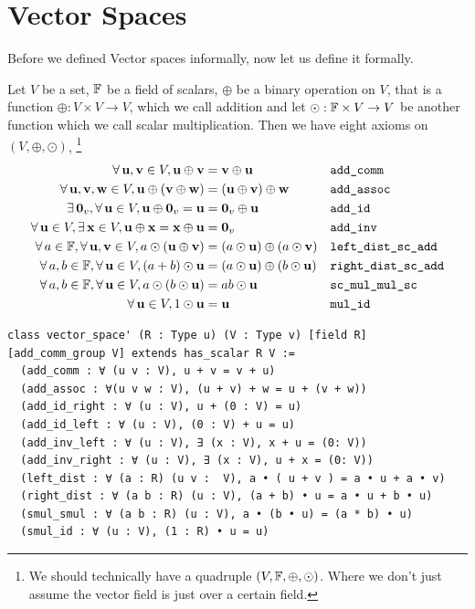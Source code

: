 \documentclass{article}
\begin{document}
\section{Vector Spaces}
Before we defined Vector spaces informally, now let us define it formally.
\begin{ndefi}
  Let $V$ be a set, $\mathbb{F}$ be a field of scalars, $\oplus$ be a binary operation on $V$, that is a function $\oplus : V\times V \to V$, which we call addition and let $\odot : \mathbb{F} \times V \to V$ be another function which we call scalar multiplication. Then we have eight axioms on $(V, \oplus, \odot)$, \footnote{We should technically have a quadruple $(V, \mathbb{F}, \oplus, \odot)$. Where we don't just assume the vector field is just over a certain field.}
  \begin{align*}
    \forall\, \boldsymbol{\mathbf{u}},\boldsymbol{\mathbf{v}} \in V, \boldsymbol{\mathbf{u}} \oplus \boldsymbol{\mathbf{v}} &= \boldsymbol{\mathbf{v}} \oplus \boldsymbol{\mathbf{u}} && \text{\texttt{add\_comm}}\\
    \forall\, \boldsymbol{\mathbf{u}}, \boldsymbol{\mathbf{v}}, \boldsymbol{\mathbf{w}} \in V, \boldsymbol{\mathbf{u}} \oplus (\boldsymbol{\mathbf{v}} \oplus \boldsymbol{\mathbf{w}}) &= (\boldsymbol{\mathbf{u}} \oplus \boldsymbol{\mathbf{v}}) \oplus \boldsymbol{\mathbf{w}} && \texttt{add\_assoc}\\
      \exists\, \boldsymbol{\mathbf{0}}_v, \forall\, \boldsymbol{\mathbf{u}} \in V, \boldsymbol{\mathbf{u}} \oplus \boldsymbol{\mathbf{0}}_v = \boldsymbol{\mathbf{u}} &= \boldsymbol{\mathbf{0}}_v \oplus \boldsymbol{\mathbf{u}} && \texttt{add\_id} \\
      \forall\, \boldsymbol{\mathbf{u}} \in V, \exists\, \boldsymbol{\mathbf{x}}\in V, \boldsymbol{\mathbf{u}} \oplus \boldsymbol{\mathbf{x}} = \boldsymbol{\mathbf{x}} \oplus \boldsymbol{\mathbf{u}} &= \boldsymbol{\mathbf{0}}_v && \texttt{add\_inv} \\
      \forall\, a \in\mathbb{F}, \forall\, \boldsymbol{\mathbf{u}},\boldsymbol{\mathbf{v}} \in V, a \odot (\boldsymbol{\mathbf{u}} \oplus \boldsymbol{\mathbf{v}}) &= (a \odot \boldsymbol{\mathbf{u}}) \oplus (a \odot \boldsymbol{\mathbf{v}}) && \texttt{left\_dist\_sc\_add}\\
      \forall\, a, b \in\mathbb{F}, \forall\, \boldsymbol{\mathbf{u}} \in V, (a + b) \odot \boldsymbol{\mathbf{u}} &= (a \odot \boldsymbol{\mathbf{u}}) \oplus (b \odot \boldsymbol{\mathbf{u}}) && \texttt{right\_dist\_sc\_add}\\
      \forall\, a, b \in \mathbb{F}, \forall\, \boldsymbol{\mathbf{u}} \in V, a \odot (b \odot \boldsymbol{\mathbf{u}}) &= ab \odot \boldsymbol{\mathbf{u}} && \texttt{sc\_mul\_mul\_sc}\\
      \forall\, \boldsymbol{\mathbf{u}} \in V, 1 \odot \boldsymbol{\mathbf{u}} &= \boldsymbol{\mathbf{u}} && \texttt{mul\_id} \\
  \end{align*}
\end{ndefi}

\begin{lstlisting}
class vector_space' (R : Type u) (V : Type v) [field R] [add_comm_group V] extends has_scalar R V :=
  (add_comm : ∀ (u v : V), u + v = v + u)
  (add_assoc : ∀(u v w : V), (u + v) + w = u + (v + w))
  (add_id_right : ∀ (u : V), u + (0 : V) = u)
  (add_id_left : ∀ (u : V), (0 : V) + u = u)
  (add_inv_left : ∀ (u : V), ∃ (x : V), x + u = (0: V))
  (add_inv_right : ∀ (u : V), ∃ (x : V), u + x = (0: V))
  (left_dist : ∀ (a : R) (u v :  V), a • ( u + v ) = a • u + a • v)
  (right_dist : ∀ (a b : R) (u : V), (a + b) • u = a • u + b • u)
  (smul_smul : ∀ (a b : R) (u : V), a • (b • u) = (a * b) • u)
  (smul_id : ∀ (u : V), (1 : R) • u = u)

\end{lstlisting}
\end{document}
